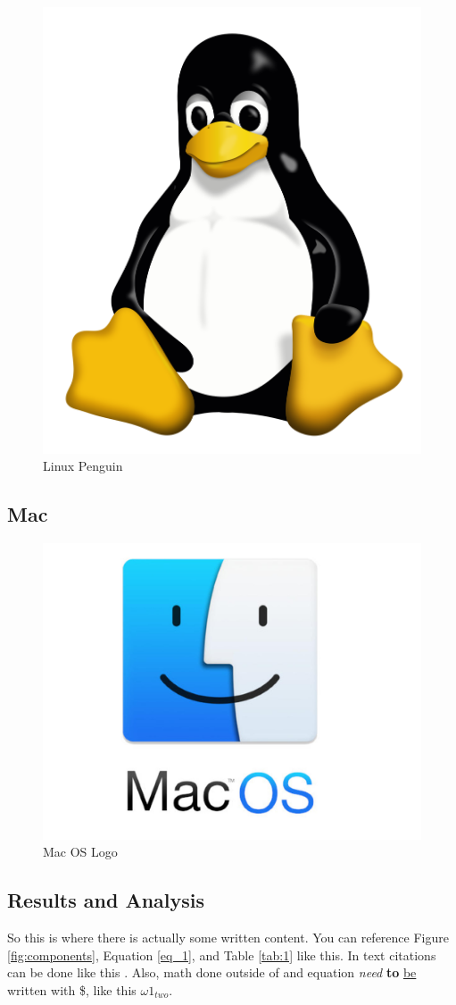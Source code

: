 \documentclass[12pt]{article}
\begin{document}
\begin{figure}[H]
	\centering
	\includegraphics[width=0.25\linewidth]{Pictures/linux.png}
	\caption{Linux Penguin}
	\label{fig:lin}
\end{figure}



\subsection{Mac}
\lipsum[9]

\begin{figure}[H]
	\centering
	\includegraphics[width=0.25\linewidth]{Pictures/mac.jpg}
	\caption{Mac OS Logo}
	\label{fig:mac}
\end{figure}











\subsection{Results and Analysis}
So this is where there is actually some written content. You can reference Figure \ref{fig:components}, Equation \ref{eq_1}, and Table \ref{tab:1} like this. In text citations can be done like this \cite{b0}. Also, math done outside of and equation \textit{need} \textbf{to} \underline{be} written with \$, like this $\omega 1 _{two}$.
\end{document}
